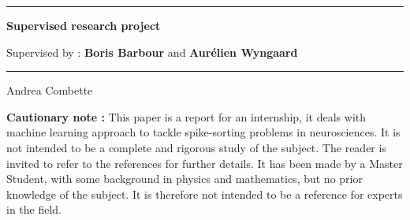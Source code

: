 \documentclass[11pt,a4paper]{report}
\author{Andrea}
\begin{document}
\begin{titlepage}
    \begin{center}
        \begin{figure}
            \begin{center}
                \vspace*{2cm}
            \end{center}
        \end{figure}
        \rule{14cm}{2pt}\vspace{.7cm}

        \textbf{Supervised research project}

        \vspace{.5cm}
        Supervised by : \textbf{Boris Barbour} and \textbf{Aurélien Wyngaard}

        \rule{14cm}{2pt}\vspace{1cm}
        \vspace{2.5cm}

        \Large Andrea Combette

        \vspace{5cm}

        \raisebox{-5pt}{\quad\decofourleft\decotwo\decofourright\quad}

        \vspace{6cm}

        \begin{minipage}{14cm}
            \small{
                \textbf{Cautionary note :} This paper is a report for an internship, it deals with machine learning approach to tackle spike-sorting problems in neurosciences. It is not intended to be a complete and rigorous study of the subject. The reader is invited to refer to the references for further details.
                It has been made by a Master Student, with some background in physics and mathematics, but no prior knowledge of the subject. It is therefore not intended to be a reference for experts in the field.
            }
        \end{minipage}
    \end{center}
\end{titlepage}
\end{document}
